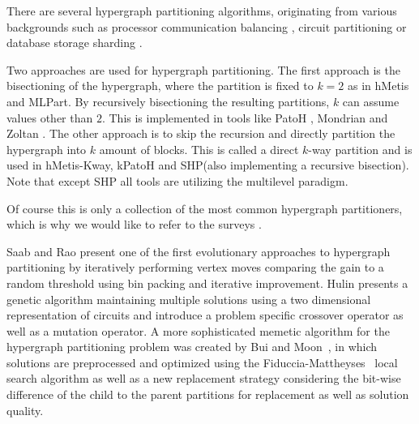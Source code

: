 \documentclass[a4paper,12pt,titlepage, BCOR7mm,headsepline]{scrbook}
\numberwithin{equation}{section}
\begin{document}
There are several hypergraph partitioning algorithms, originating from various backgrounds such as processor communication balancing \cite{catalyurek1999hypergraph}, circuit partitioning \cite{alpert1998multilevel} or database storage sharding \cite{kabiljo2017social}.

Two approaches are used for hypergraph partitioning. The first approach is the bisectioning of the hypergraph, where the partition is fixed to $k=2$ as in hMetis\cite{karypis1999multilevel} and MLPart\cite{alpert1998multilevel}. By recursively bisectioning the resulting partitions, $k$ can assume values other than $2$. This is implemented in tools like PatoH \cite{catalyurek1999hypergraph}, Mondrian\cite{vastenhouw2005two} and Zoltan\cite{devine2006parallel}%
. The other approach is to skip the recursion and directly partition the hypergraph into $k$ amount of blocks. This is called a direct $k$-way partition and is used in hMetis-Kway\cite{karypis2000multilevel}, kPatoH \cite{aykanat2008multi} and SHP\cite{kabiljo2017social}(also implementing a recursive bisection). Note that except SHP \cite{kabiljo2017social} all tools are utilizing the multilevel paradigm. 

Of course this is only a collection of the most common hypergraph partitioners, which is why we would like to refer to the surveys \cite{alpert1995recent}\cite{bader2013graph}\cite{papa2007hypergraph}\cite{trifunovic2006parallel}.





Saab and Rao \cite{saab1989evolution} present one of the first evolutionary approaches to hypergraph partitioning by iteratively performing vertex moves comparing the gain to a random threshold using bin packing and iterative improvement. Hulin \cite{hulin1990circuit} presents a genetic algorithm maintaining multiple solutions using a two dimensional representation of circuits and introduce a problem specific crossover operator as well as a mutation operator. A more sophisticated memetic algorithm for the hypergraph partitioning problem was created by Bui and Moon~\cite{bui1994fast}, in which solutions are preprocessed and optimized using the Fiduccia-Mattheyses~\cite{fiduccia1988linear} local search algorithm as well as a new replacement strategy considering the bit-wise difference of the child to the parent partitions for replacement as well as solution quality. 
\end{document}
